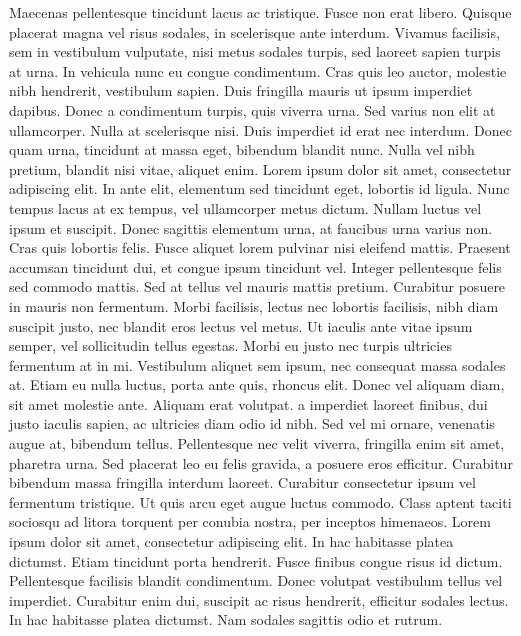 \documentclass[12pt,a4paper,twoside, twocolumn]{article}
\begin{document}
Maecenas pellentesque tincidunt lacus ac tristique. Fusce non erat libero. Quisque placerat magna vel risus sodales, in scelerisque ante interdum. Vivamus facilisis, sem in vestibulum vulputate, nisi metus sodales turpis, sed laoreet sapien turpis at urna. In vehicula nunc eu congue condimentum. Cras quis leo auctor, molestie nibh hendrerit, vestibulum sapien. Duis fringilla mauris ut ipsum imperdiet dapibus. Donec a condimentum turpis, quis viverra urna. Sed varius non elit at ullamcorper. Nulla at scelerisque nisi. Duis imperdiet id erat nec interdum. Donec quam urna, tincidunt at massa eget, bibendum blandit nunc. Nulla vel nibh pretium, blandit nisi vitae, aliquet enim. Lorem ipsum dolor sit amet, consectetur adipiscing elit. In ante elit, elementum sed tincidunt eget, lobortis id ligula.
Nunc tempus lacus at ex tempus, vel ullamcorper metus dictum. Nullam luctus vel ipsum et suscipit. Donec sagittis elementum urna, at faucibus urna varius non. Cras quis lobortis felis. Fusce aliquet lorem pulvinar nisi eleifend mattis. Praesent accumsan tincidunt dui, et congue ipsum tincidunt vel. Integer pellentesque felis sed commodo mattis. Sed at tellus vel mauris mattis pretium. Curabitur posuere in mauris non fermentum. Morbi facilisis, lectus nec lobortis facilisis, nibh diam suscipit justo, nec blandit eros lectus vel metus. Ut iaculis ante vitae ipsum semper, vel sollicitudin tellus egestas. Morbi eu justo nec turpis ultricies fermentum at in mi. Vestibulum aliquet sem ipsum, nec consequat massa sodales at. Etiam eu nulla luctus, porta ante quis, rhoncus elit. Donec vel aliquam diam, sit amet molestie ante. Aliquam erat volutpat.
a imperdiet laoreet finibus, dui justo iaculis sapien, ac ultricies diam odio id nibh. Sed vel mi ornare, venenatis augue at, bibendum tellus. Pellentesque nec velit viverra, fringilla enim sit amet, pharetra urna. Sed placerat leo eu felis gravida, a posuere eros efficitur. Curabitur bibendum massa fringilla interdum laoreet. Curabitur consectetur ipsum vel fermentum tristique. Ut quis arcu eget augue luctus commodo. Class aptent taciti sociosqu ad litora torquent per conubia nostra, per inceptos himenaeos. Lorem ipsum dolor sit amet, consectetur adipiscing elit. In hac habitasse platea dictumst.
Etiam tincidunt porta hendrerit. Fusce finibus congue risus id dictum. Pellentesque facilisis blandit condimentum. Donec volutpat vestibulum tellus vel imperdiet. Curabitur enim dui, suscipit ac risus hendrerit, efficitur sodales lectus. In hac habitasse platea dictumst. Nam sodales sagittis odio et rutrum.
\end{document}
